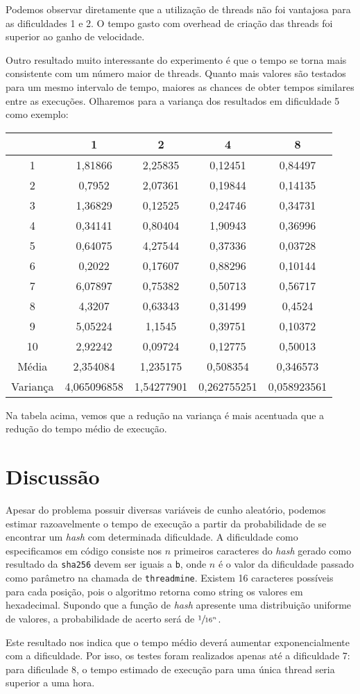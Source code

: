 \documentclass[12pt]{article}
\begin{document}
Podemos observar diretamente que a utilização de threads não foi vantajosa para as dificuldades 1 e 2. O tempo gasto com overhead de criação das threads foi superior ao ganho de velocidade.

Outro resultado muito interessante do experimento é que o tempo se torna mais consistente com um número maior de threads. Quanto mais valores são testados para um mesmo intervalo de tempo, maiores as chances de obter tempos similares entre as execuções. Olharemos para a variança dos resultados em dificuldade 5 como exemplo:

\begin{tabular}{|c|c|c|c|c|}
	\hline		
	& 1	& 2	& 4	& 8\\
	\hline
	1 & 1,81866	& 2,25835 & 0,12451	& 0,84497 \\
	\hline
	2 & 0,7952 & 2,07361 & 0,19844 & 0,14135 \\
	\hline
	3 & 1,36829 & 0,12525 & 0,24746 & 0,34731 \\
	\hline
	4 & 0,34141 & 0,80404 & 1,90943 & 0,36996 \\
	\hline
	5 & 0,64075 & 4,27544 & 0,37336 & 0,03728 \\
	\hline
	6 & 0,2022 & 0,17607 & 0,88296 & 0,10144 \\
	\hline
	7 & 6,07897 & 0,75382 & 0,50713 & 0,56717 \\
	\hline
	8 & 4,3207 & 0,63343 & 0,31499 & 0,4524 \\
	\hline
	9 & 5,05224 & 1,1545 & 0,39751 & 0,10372 \\
	\hline
	10 & 2,92242 & 0,09724 & 0,12775 & 0,50013 \\ 
	\hline
	Média & 2,354084 & 1,235175 & 0,508354 & 0,346573 \\
	\hline
	Variança & 4,065096858 & 1,54277901 & 0,262755251 & 0,058923561 \\
	\hline
\end{tabular}

Na tabela acima, vemos que a redução na variança é mais acentuada que a redução do tempo médio de execução.

\section{Discussão}
Apesar do problema possuir diversas variáveis de cunho aleatório, podemos estimar razoavelmente o tempo de execução a partir da probabilidade de se encontrar um \textit{hash} com determinada dificuldade. A dificuldade como especificamos em código consiste nos $n$ primeiros caracteres do \textit{hash} gerado como resultado da \texttt{sha256} devem ser iguais a \texttt{\textquotesingle{}b\textquotesingle{}}, onde $n$ é o valor da dificuldade passado como parâmetro na chamada de \texttt{threadmine}. Existem 16 caracteres possíveis para cada posição, pois o algoritmo retorna como string os valores em hexadecimal. Supondo que a função de \textit{hash} apresente uma distribuição uniforme de valores, a probabilidade de acerto será de $\sfrac{1}{16^{n}}$.

Este resultado nos indica que o tempo médio deverá aumentar exponencialmente com a dificuldade. Por isso, os testes foram realizados apenas até a dificuldade 7: para dificulade 8, o tempo estimado de execução para uma única thread seria superior a uma hora.

\nocite{*}
\printbibliography
\end{document}
